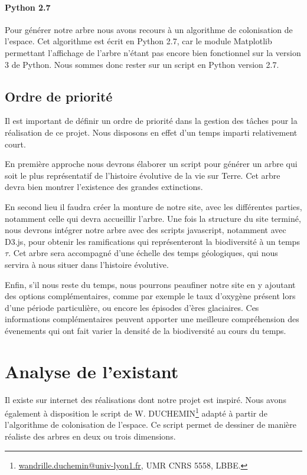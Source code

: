 \documentclass[a4paper]{article}
\begin{document}
		\paragraph{Python 2.7}
		Pour générer notre arbre nous avons recours à un algorithme de colonisation de l'espace. Cet algorithme est écrit en Python 2.7, car le module Matplotlib permettant l'affichage de l'arbre n'étant pas encore bien fonctionnel sur la version 3 de Python. Nous sommes donc rester sur un script en Python version 2.7. 
	
	\subsection{Ordre de priorité}
		
		Il est important de définir un ordre de priorité dans la gestion des tâches pour la réalisation de ce projet. Nous disposons en effet d'un temps imparti relativement court.

		
		En première approche nous devrons élaborer un script pour générer un arbre qui soit le plus représentatif de l'histoire évolutive de la vie sur Terre. Cet arbre devra bien montrer l'existence des grandes extinctions. 
		
		En second lieu il faudra créer la monture de notre site, avec les différentes parties, notamment celle qui devra accueillir l'arbre.
		Une fois la structure du site terminé, nous devrons intégrer notre arbre avec des scripts javascript, notamment avec D3.js, pour obtenir les ramifications qui représenteront la biodiversité à un temps $\tau$. Cet arbre sera accompagné d'une échelle des temps géologiques, qui nous servira à nous situer dans l'histoire évolutive.

		
		Enfin, s'il nous reste du temps, nous pourrons peaufiner notre site en y ajoutant des options complémentaires, comme par exemple le taux d'oxygène présent lors d'une période particulière, ou encore les épisodes d'ères glaciaires. Ces informations complémentaires peuvent apporter une meilleure compréhension des évenements qui ont fait varier la densité de la biodiversité au cours du temps.

\section{Analyse de l'existant}
	Il existe sur internet des réalisations dont notre projet est inspiré. Nous avons également à disposition le script de W. DUCHEMIN\footnote{\url{wandrille.duchemin@univ-lyon1.fr}, UMR CNRS 5558, LBBE.} adapté à partir de l'algorithme de colonisation de l'espace. Ce script permet de dessiner de manière réaliste des arbres en deux ou trois dimensions.
\end{document}
